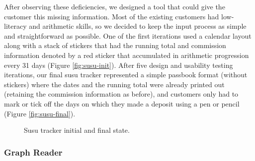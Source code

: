 \documentclass{sig-alternate}
\begin{document}
After observing these deficiencies, we designed a tool that could give the customer this missing information. Most of the existing customers had low-literacy and arithmetic skills, so we decided to keep the input process as simple and straightforward as possible. One of the first iterations used a calendar layout along with a stack of stickers that had the running total and commission information denoted by a red sticker that accumulated in arithmetic progression every 31 days (Figure \ref{fig:susu-init}). After five design and usability testing iterations, our final susu tracker represented a simple passbook format (without stickers) where the dates and the running total were already printed out (retaining the commission information as before), and customers only had to mark or tick off the days on which they made a deposit using a pen or pencil (Figure \ref{fig:susu-final}).

\begin{figure}%
    \centering
    \qquad
    \caption{Susu tracker initial and final state.}%
    \label{fig:susu}%
\end{figure}

\subsubsection{Graph Reader}
\end{document}
